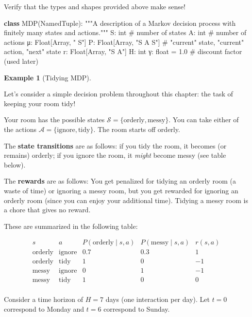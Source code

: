 \documentclass[
  letterpaper,
  DIV=11,
  numbers=noendperiod]{scrreprt}
\newenvironment{Shaded}{\begin{snugshade}}{\end{snugshade}}
\newcommand{\BuiltInTok}[1]{\textcolor[rgb]{0.00,0.23,0.31}{#1}}
\newcommand{\CommentTok}[1]{\textcolor[rgb]{0.37,0.37,0.37}{#1}}
\newcommand{\FloatTok}[1]{\textcolor[rgb]{0.68,0.00,0.00}{#1}}
\newcommand{\KeywordTok}[1]{\textcolor[rgb]{0.00,0.23,0.31}{\textbf{#1}}}
\newcommand{\NormalTok}[1]{\textcolor[rgb]{0.00,0.23,0.31}{#1}}
\newcommand{\OperatorTok}[1]{\textcolor[rgb]{0.37,0.37,0.37}{#1}}
\newcommand{\StringTok}[1]{\textcolor[rgb]{0.13,0.47,0.30}{#1}}
\theoremstyle{plain}
\theoremstyle{plain}
\theoremstyle{definition}
\newtheorem{example}{Example}[chapter]
\theoremstyle{definition}
\theoremstyle{remark}
\begin{document}
Verify that the types and shapes provided above make sense!

\begin{Shaded}
\begin{Highlighting}[]
\KeywordTok{class}\NormalTok{ MDP(NamedTuple):}
    \CommentTok{"""A description of a Markov decision process with finitely many states and actions."""}
\NormalTok{    S: }\BuiltInTok{int}  \CommentTok{\# number of states}
\NormalTok{    A: }\BuiltInTok{int}  \CommentTok{\# number of actions}
\NormalTok{    μ: Float[Array, }\StringTok{" S"}\NormalTok{]}
\NormalTok{    P: Float[Array, }\StringTok{"S A S"}\NormalTok{]  }\CommentTok{\# "current" state, "current" action, "next" state}
\NormalTok{    r: Float[Array, }\StringTok{"S A"}\NormalTok{]}
\NormalTok{    H: }\BuiltInTok{int}
\NormalTok{    γ: }\BuiltInTok{float} \OperatorTok{=} \FloatTok{1.0}  \CommentTok{\# discount factor (used later)}
\end{Highlighting}
\end{Shaded}

\begin{example}[Tidying
MDP]\protect\hypertarget{exm-tidy_mdp}{}\label{exm-tidy_mdp}

Let's consider a simple decision problem throughout this chapter: the
task of keeping your room tidy!

Your room has the possible states
\(\mathcal{S} = \{ \text{orderly}, \text{messy} \}.\) You can take
either of the actions
\(\mathcal{A} = \{ \text{ignore}, \text{tidy} \}.\) The room starts off
orderly.

The \textbf{state transitions} are as follows: if you tidy the room, it
becomes (or remains) orderly; if you ignore the room, it \emph{might}
become messy (see table below).

The \textbf{rewards} are as follows: You get penalized for tidying an
orderly room (a waste of time) or ignoring a messy room, but you get
rewarded for ignoring an orderly room (since you can enjoy your
additional time). Tidying a messy room is a chore that gives no reward.

These are summarized in the following table:

\[
\begin{array}{ccccc}
    s & a & P(\text{orderly} \mid s, a) & P(\text{messy} \mid s, a) & r(s, a) \\
    \text{orderly} & \text{ignore} & 0.7 & 0.3 & 1 \\
    \text{orderly} & \text{tidy} & 1 & 0 & -1 \\
    \text{messy} & \text{ignore} & 0 & 1 & -1 \\
    \text{messy} & \text{tidy} & 1 & 0 & 0 \\
\end{array}
\]

Consider a time horizon of \(H= 7\) days (one interaction per day). Let
\(t = 0\) correspond to Monday and \(t = 6\) correspond to Sunday.

\end{example}
\end{document}
